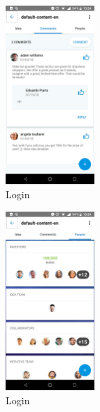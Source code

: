 \begin{figure}[!h]
	\begin{center}
		\includegraphics[width=0.3\textwidth]{./img/anexo1/ver_idea_comentarios.png}
		\caption{Login}
		\label{fig:ver_idea_comentarios}
	\end{center}
\end{figure}

\begin{figure}[!h]
	\begin{center}
		\includegraphics[width=0.3\textwidth]{./img/anexo1/ver_idea_gente.png}
		\caption{Login}
		\label{fig:ver_idea_gente}
	\end{center}
\end{figure}

